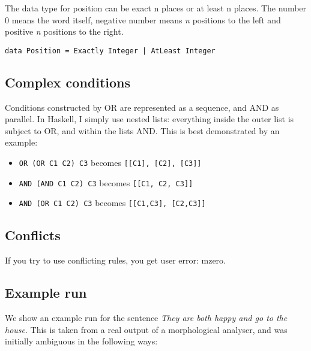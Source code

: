 \documentclass[a4paper, 11pt]{article}
\begin{document}
The data type for position can be exact n places or at least n places. The number 0 means the word itself, negative number means \emph{n} positions to the left and positive \emph{n} positions to the right.

\begin{lstlisting}
data Position = Exactly Integer | AtLeast Integer
 \end{lstlisting}

\subsection{Complex conditions}
Conditions constructed by OR are represented as a sequence, and AND as
parallel. In Haskell, I simply use nested lists: everything inside the
outer list is subject to OR, and within the lists AND. This is best
demonstrated by an example:

\begin{itemize}
\item \texttt{OR (OR C1 C2) C3} becomes \texttt{[[C1], [C2], [C3]]} 
\item \texttt{AND (AND C1 C2) C3} becomes \texttt{[[C1, C2, C3]]} 
\item \texttt{AND (OR C1 C2) C3} becomes \texttt{[[C1,C3], [C2,C3]]}
\end{itemize}

\subsection{Conflicts}
If you try to use conflicting rules, you get user error: mzero.

\subsection{Example run}

We show an example run for the sentence \emph{They are both happy and go to the house}. This is
taken from a real output of a morphological analyser, and was
initially ambiguous in the following ways:
\end{document}
